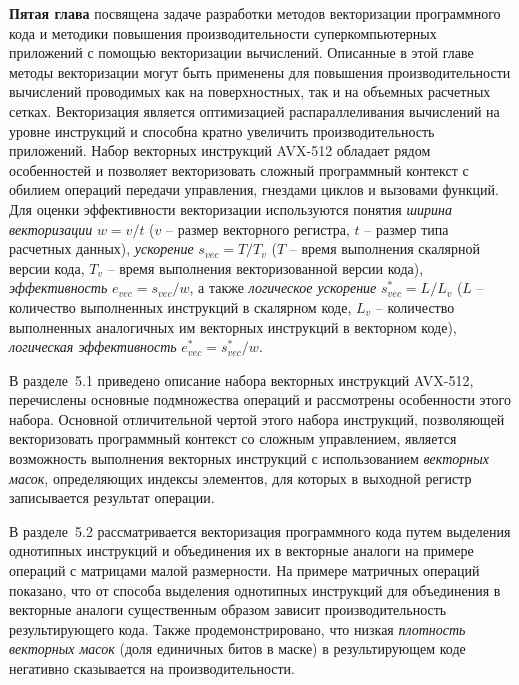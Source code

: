 \documentclass[a4paper,14pt]{extarticle}                     %
\theoremstyle{plain}                                         %
\begin{document}
\textbf{Пятая глава} посвящена задаче разработки методов векторизации программного кода и методики повышения производительности суперкомпьютерных приложений с помощью векторизации вычислений.
Описанные в этой главе методы векторизации могут быть применены для повышения производительности вычислений проводимых как на поверхностных, так и на объемных расчетных сетках.
Векторизация является оптимизацией распараллеливания вычислений на уровне инструкций и способна кратно увеличить производительность приложений.
Набор векторных инструкций AVX-512 обладает рядом особенностей и позволяет векторизовать сложный программный контекст с обилием операций передачи управления, гнездами циклов и вызовами функций.
Для оценки эффективности векторизации используются понятия \textit{ширина векторизации} $w = v/t$ ($v$ -- размер векторного регистра, $t$ -- размер типа расчетных данных), \textit{ускорение} $s_{vec} = T/T_v$ ($T$ -- время выполнения скалярной версии кода, $T_v$ -- время выполнения векторизованной версии кода), \textit{эффективность} $e_{vec} = s_{vec}/w$, а также \textit{логическое ускорение} $s_{vec}^{*} = L/L_v$ ($L$ -- количество выполненных инструкций в скалярном коде, $L_v$ -- количество выполненных аналогичных им векторных инструкций в векторном коде), \textit{логическая эффективность} $e_{vec}^{*} = s_{vec}^{*}/w$.


В разделе~5.1 приведено описание набора векторных инструкций AVX-512, перечислены основные подмножества операций и рассмотрены особенности этого набора.
Основной отличительной чертой этого набора инструкций, позволяющей векторизовать программный контекст со сложным управлением, является возможность выполнения векторных инструкций с использованием \textit{векторных масок}, определяющих индексы элементов, для которых в выходной регистр записывается результат операции.


В разделе~5.2 рассматривается векторизация программного кода путем выделения однотипных инструкций и объединения их в векторные аналоги на примере операций с матрицами малой размерности.
На примере матричных операций показано, что от способа выделения однотипных инструкций для объединения в векторные аналоги существенным образом зависит производительность результирующего кода.
Также продемонстрировано, что низкая \textit{плотность векторных масок} (доля единичных битов в маске) в результирующем коде негативно сказывается на производительности.
\end{document}
